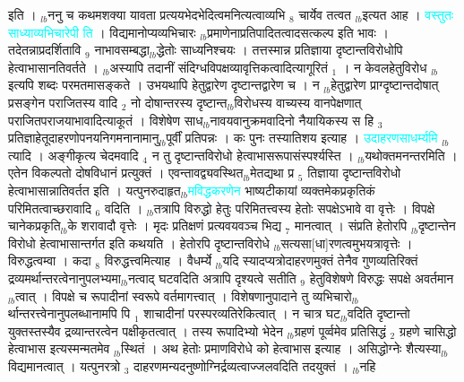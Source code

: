 \documentclass[article,12pt,a4paper]{memoir}%
\newcommand{\quotelemma}[1]{\textcolor{cyan}{#1}}
\begin{document}
	    \pstart  \leavevmode%
	    \hphantom{.}
	  इति । {\tiny $_{lb}$}ननु च कथमशक्या यावता प्रत्ययभेदभेदित्वमनित्यत्वाव्यभि {\tiny $_{8}$} चार्येव तत्वत {\tiny $_{lb}$}इत्यत आह । \quotelemma{वस्तुतः साध्याव्यभिचारेपी \cite[11b7]{vn-msN} ति} । विद्यमानोप्यव्यभिचारः {\tiny $_{lb}$}प्रमाणेनाप्रतिपादितत्वादसत्कल्प इति भावः । तदेतन्नाप्रदर्शितावि {\tiny $_{9}$} \leavevmode{} नाभावसम्बद्धा{\tiny $_{lb}$}द्धेतोः साध्यनिश्चयः । तत्तस्मान्न प्रतिज्ञाया दृष्टान्तविरोधोपि हेत्वाभासानतिवर्तते । {\tiny $_{lb}$}अस्यापि तदानीं संदिग्धविपक्षव्यावृत्तिकत्वादित्यागूरितं {\tiny $_{1}$} । न केवलहेतुविरोध {\tiny $_{lb}$}इत्यपि शब्दः परमतमासङ्कते । उभयथापि हेतुद्वारेण दृष्टान्तद्वारेण च । न {\tiny $_{lb}$}हेतुद्वारेण प्राग्दृष्टान्तदोषात् प्रसङ्गेन पराजितस्य वादि {\tiny $_{2}$} नो दोषान्तरस्य दृष्टान्त{\tiny $_{lb}$}विरोधस्य वाच्यस्य वानपेक्षणात् पराजितपराजयाभावादित्याकूतं । विशेषेण साध{\tiny $_{lb}$}नावयवानुक्रमवादिनो नैयायिकस्य स हि {\tiny $_{3}$} प्रतिज्ञाहेतूदाहरणोपनयनिगमनानामानु{\tiny $_{lb}$}पूर्वीं प्रतिपन्नः । कः पुनः तस्यातिशय इत्याह । \quotelemma{उदाहरणसाधर्म्यमि} \cite[11b9]{vn-msN}{\tiny $_{lb}$}त्यादि । अङ्गीकृत्य चेदमवादि {\tiny $_{4}$} न तु दृष्टान्तविरोधो हेत्वाभासरूपासंस्पर्श्यस्ति । {\tiny $_{lb}$}यथोक्तमनन्तरमिति । एतेन विकल्पतो दोषविधानं प्रत्युक्तं । एवन्तावद्व्यवस्थित{\tiny $_{lb}$}मेतद्यथा प्र {\tiny $_{5}$} तिज्ञाया दृष्टान्तविरोधो हेत्वाभासान्नातिवर्तत इति । यत्पुनरुदाहृत{\tiny $_{lb}$}\quotelemma{मविद्धकरणेन} भाष्यटीकायां व्यक्तमेकप्रकृतिकं परिमितत्वाच्छरावादि {\tiny $_{6}$} वदिति । {\tiny $_{lb}$}तत्रापि विरुद्धो हेतुः परिमितत्त्वस्य हेतोः सपक्षेऽभावे वा वृत्तेः । विपक्षे चानेकप्रकृति{\tiny $_{lb}$}के शरावादौ वृत्तेः । मृदः प्रतिक्षणं प्रत्यवयवञ्च भिद्य {\tiny $_{7}$} मानत्वात् । संप्रति हेतोरपि {\tiny $_{lb}$}दृष्टान्तेन विरोधो हेत्वाभासान्तर्गत इति कथयति । हेतोरपि दृष्टान्तविरोधे {\tiny $_{lb}$}सत्यसा[धा]रणत्वमुभयत्रावृत्तेः । विरुद्धत्वम्वा । कदा {\tiny $_{8}$} विरुद्धत्त्वमित्याह । वैधर्म्ये {\tiny $_{lb}$}यदि स्यादप्यत्रोदाहरणमुक्तं तेनैव गुणव्यतिरिक्तं द्रव्यमर्थान्तरत्वेनानुपलभ्यमा{\tiny $_{lb}$}नत्वाद् घटवदिति अत्रापि दृश्यत्वे सतीति {\tiny $_{9}$} \leavevmode{} हेतुविशेषणे विरुद्धः सपक्षे अवर्तमान{\tiny $_{lb}$}त्वात् । विपक्षे च रूपादीनां स्वरूपे वर्तमागत्त्वात् । विशेषणानुपादाने तु व्यभिचारो{\tiny $_{lb}$}\leavevmode{} र्थान्तरत्त्वेनानुपलब्धानामपि पि {\tiny $_{1}$} शाचादीनां परस्परव्यतिरेकित्वात् । न चात्र घट{\tiny $_{lb}$}वदिति दृष्टान्तो युक्तस्तस्यैव द्रव्यान्तरत्वेन पक्षीकृतत्वात् । तस्य रूपादिभ्यो भेदेन {\tiny $_{lb}$}ग्रहणं पूर्व्वमेव प्रतिसिद्धं {\tiny $_{2}$} ग्रहणे चासिद्धो हेत्वाभास इत्यस्मन्मतमेव {\tiny $_{lb}$}स्थितं । अथ हेतोः प्रमाणविरोधे को हेत्वाभास इत्याह । असिद्धोग्नेः शैत्यस्या{\tiny $_{lb}$}विद्यमानत्वात् । यत्पुनरत्रो {\tiny $_{3}$} दाहरणमन्यदनुष्णोग्निर्द्रव्यत्वाज्जलवदिति तदयुक्तं । {\tiny $_{lb}$}नहि 
\end{document}
